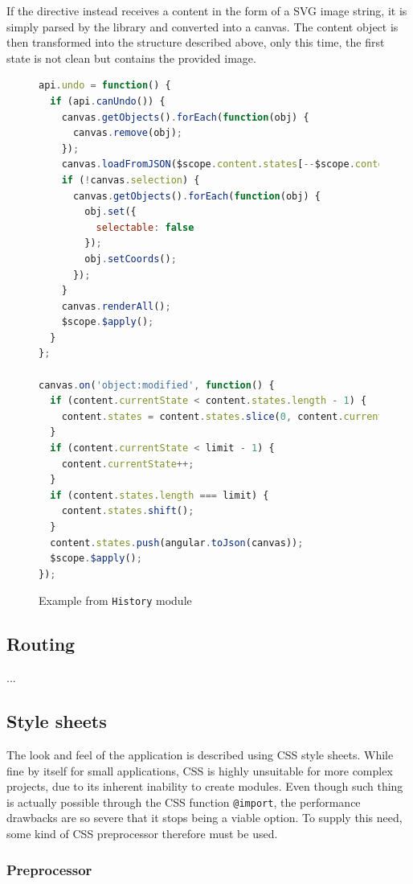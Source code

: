 \documentclass[thesis=M,english,hidelinks]{FITthesis}[2012/10/20]
\newcommand{\code}{\texttt}
\begin{document}
If the directive instead receives a content in the form of a SVG image string, it is simply parsed by the library and converted into a canvas. The content object is then transformed into the structure described above, only this time, the first state is not clean but contains the provided image.

\begin{figure}
  \begin{lstlisting}[language=JavaScript]
api.undo = function() {
  if (api.canUndo()) {
    canvas.getObjects().forEach(function(obj) {
      canvas.remove(obj);
    });
    canvas.loadFromJSON($scope.content.states[--$scope.content.currentState]);
    if (!canvas.selection) {
      canvas.getObjects().forEach(function(obj) {
        obj.set({
          selectable: false
        });
        obj.setCoords();
      });
    }
    canvas.renderAll();
    $scope.$apply();
  }
};

canvas.on('object:modified', function() {
  if (content.currentState < content.states.length - 1) {
    content.states = content.states.slice(0, content.currentState + 1);
  }
  if (content.currentState < limit - 1) {
    content.currentState++;
  }
  if (content.states.length === limit) {
    content.states.shift();
  }
  content.states.push(angular.toJson(canvas));
  $scope.$apply();
});
  \end{lstlisting}
  \caption{Example from \code{History} module}
  \label{fig:history_module}
\end{figure}

  \subsection{Routing}

  ...

  \subsection{Style sheets}

The look and feel of the application is described using CSS style sheets. While fine by itself for small applications, CSS is highly unsuitable for more complex projects, due to its inherent inability to create modules. Even though such thing is actually possible through the CSS function \code{@import}, the performance drawbacks are so severe that it stops being a viable option. To supply this need, some kind of CSS preprocessor therefore must be used.

    \subsubsection{Preprocessor}
\end{document}
